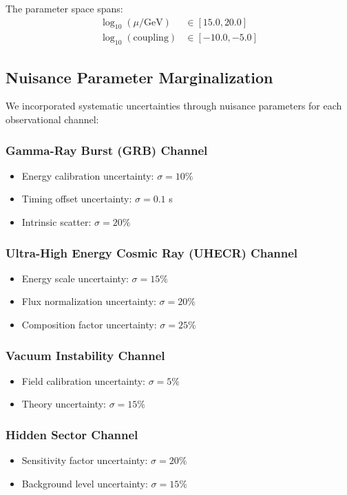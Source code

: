 \documentclass[11pt]{article}
\begin{document}
The parameter space spans:
\begin{align}
\log_{10}(\mu/\text{GeV}) &\in [15.0, 20.0] \\
\log_{10}(\text{coupling}) &\in [-10.0, -5.0]
\end{align}

\subsection{Nuisance Parameter Marginalization}

We incorporated systematic uncertainties through nuisance parameters for each observational channel:

\subsubsection{Gamma-Ray Burst (GRB) Channel}
\begin{itemize}
    \item Energy calibration uncertainty: $\sigma = 10\%$
    \item Timing offset uncertainty: $\sigma = 0.1$ s  
    \item Intrinsic scatter: $\sigma = 20\%$
\end{itemize}

\subsubsection{Ultra-High Energy Cosmic Ray (UHECR) Channel}
\begin{itemize}
    \item Energy scale uncertainty: $\sigma = 15\%$
    \item Flux normalization uncertainty: $\sigma = 20\%$
    \item Composition factor uncertainty: $\sigma = 25\%$
\end{itemize}

\subsubsection{Vacuum Instability Channel}
\begin{itemize}
    \item Field calibration uncertainty: $\sigma = 5\%$
    \item Theory uncertainty: $\sigma = 15\%$
\end{itemize}

\subsubsection{Hidden Sector Channel}
\begin{itemize}
    \item Sensitivity factor uncertainty: $\sigma = 20\%$
    \item Background level uncertainty: $\sigma = 15\%$
\end{itemize}
\end{document}
